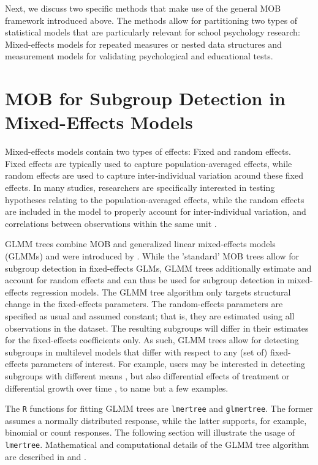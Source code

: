 \documentclass[doc,floatsintext,natbib]{apa7}
\begin{document}
Next, we discuss two specific methods that make use of the general MOB framework introduced above. The methods allow for partitioning two types of statistical models that are particularly relevant for school psychology research: Mixed-effects models for repeated measures or nested data structures and measurement models for validating psychological and educational tests. 


\section{MOB for Subgroup Detection in Mixed-Effects Models}
\label{sec:glmmtree}

Mixed-effects models contain two types of effects: Fixed and random effects. Fixed effects are typically used to capture population-averaged effects, while random effects are used to capture inter-individual variation around these fixed effects. In many studies, researchers are specifically interested in testing hypotheses relating to the population-averaged effects, while the random effects are included in the model to properly account for inter-individual variation, and correlations between observations within the same unit \citep{RaudyBush02}.

GLMM trees combine MOB and generalized linear mixed-effects models (GLMMs) and were introduced by \cite{FokkySmit18}. While the 'standard' MOB trees \citep{ZeilyHoth08} allow for subgroup detection in fixed-effects GLMs, GLMM trees additionally estimate and account for random effects and can thus be used for subgroup detection in mixed-effects regression models. The GLMM tree algorithm only targets structural change in the fixed-effects parameters. The random-effects parameters are specified as usual and assumed constant; that is, they are estimated using all observations in the dataset. The resulting subgroups will differ in their estimates for the fixed-effects coefficients only. As such, GLMM trees allow for detecting subgroups in multilevel models that differ with respect to any (set of) fixed-effects parameters of interest. For example, users may be interested in detecting subgroups with different means \citep{FokkyEdbr21}, but also differential effects of treatment \citep{FokkySmit18} or differential growth over time \citep{FokkyZeil24}, to name but a few examples. 

The \texttt{R} functions for fitting GLMM trees are \texttt{lmertree} and \texttt{glmertree}. The former assumes a normally distributed response, while the latter supports, for example, binomial or count responses. The following section will illustrate the usage of \texttt{lmertree}. Mathematical and computational details of the GLMM tree algorithm are described in \cite{FokkySmit18} and \cite{FokkyZeil24}. 
\end{document}
